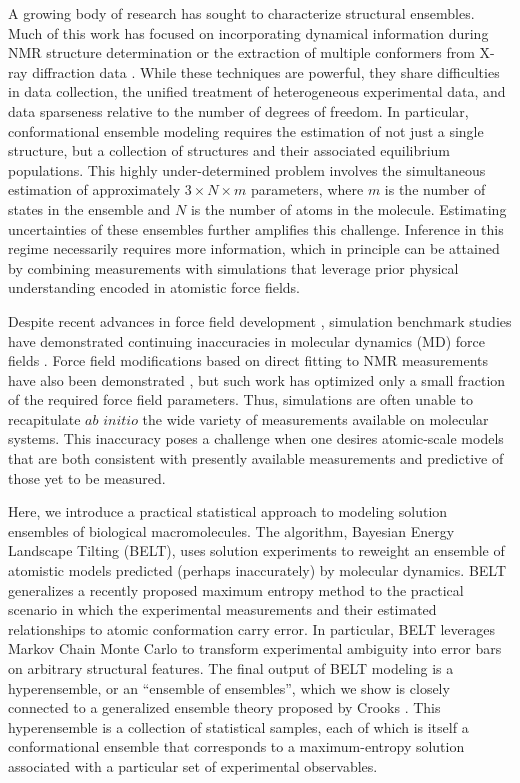 \documentclass[journal=jacsat,manuscript=article]{achemso}
\begin{document}
A growing body of research has sought to characterize structural ensembles.  Much of this work has focused on incorporating dynamical information during NMR structure determination  \cite{lindorff2005simultaneous, lange2008recognition} or the extraction of multiple conformers from X-ray diffraction data  \cite{depristo2004heterogeneity, lang2010automated}.  While these techniques are powerful, they share difficulties in data collection, the unified treatment of heterogeneous experimental data, and data sparseness relative to the number of degrees of freedom.  In particular, conformational ensemble modeling requires the estimation of not just a single structure, but a collection of structures and their associated equilibrium populations.  This highly under-determined problem involves the simultaneous estimation of approximately $3 \times N \times m$ parameters, where $m$ is the number of states in the ensemble and $N$ is the number of atoms in the molecule. Estimating uncertainties of these ensembles further 
amplifies this challenge.  Inference in this regime necessarily requires more information, which in principle can be attained by combining measurements with simulations that leverage prior physical understanding encoded in atomistic force fields. 

Despite recent advances in force field development \cite{best2008, lindorff2012systematic}, simulation benchmark studies have demonstrated continuing inaccuracies in molecular dynamics (MD) force fields \cite{beauchamp2012protein}.  Force field modifications based on direct fitting to NMR measurements have also been demonstrated \cite{li2011iterative, best2012optimization, nerenberg2011}, but such work has optimized only a small fraction of the required force field parameters.  Thus, simulations are often unable to recapitulate $ab$ $initio$ the wide variety of measurements available on molecular systems.  This inaccuracy poses a challenge when one desires atomic-scale models that are both consistent with presently available measurements and predictive of those yet to be measured.  

Here, we introduce a practical statistical approach to modeling solution ensembles of biological macromolecules.  The algorithm, Bayesian Energy Landscape Tilting (BELT), uses solution experiments to reweight an ensemble of atomistic models predicted (perhaps inaccurately) by molecular dynamics.  BELT generalizes a recently proposed maximum entropy method \cite{chodera2012} to the practical scenario in which the experimental measurements and their estimated relationships to atomic conformation carry error. In particular, BELT leverages Markov Chain Monte Carlo \cite{patil2010pymc} to transform experimental ambiguity into error bars on arbitrary structural features. The final output of BELT modeling is a hyperensemble, or an ``ensemble of ensembles'', which we show is closely connected to a generalized ensemble theory proposed by Crooks \cite{crooks2007beyond}. This hyperensemble is a collection of statistical samples, each of which is itself a conformational ensemble that corresponds to 
a maximum-entropy solution associated with a particular set of experimental observables. 
\end{document}
